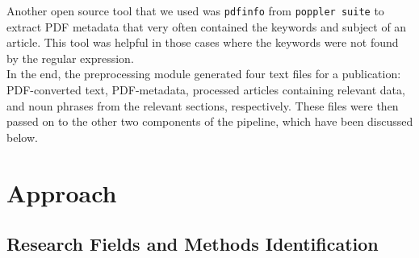 \documentclass[runningheads]{llncs}
\begin{document}
Another open source tool that we used was \texttt{pdfinfo} from \texttt{poppler suite} %
to extract PDF metadata that very often contained the keywords and subject of an article. This tool was helpful in those cases where the keywords were not found by the regular expression. \\
In the end, the preprocessing module generated four text files for a publication: PDF-converted text, PDF-metadata, processed articles containing relevant data, and noun phrases from the relevant sections, respectively. These files were then passed on to the other two components of the pipeline, which have been discussed below. %

\section{Approach}


\subsection{Research Fields and Methods Identification}
\end{document}
